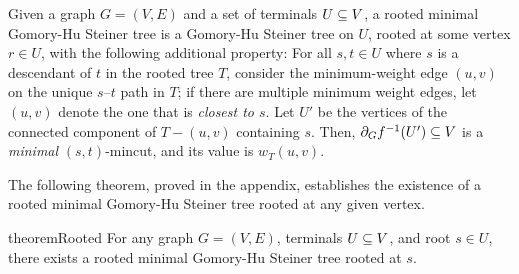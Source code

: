 \label{defn:minimalGH}
Given a graph $G=(V,E)$ and a set of terminals $U\subseteq V$, a rooted minimal Gomory-Hu Steiner tree is a Gomory-Hu Steiner tree on $U$, rooted at some vertex $r\in U$, with the following additional property:
 \BI
 \im[$(*)$] For all $s,t\in U$ where $s$ is a descendant of $t$ in the rooted tree $T$, consider the minimum-weight edge $(u,v)$ on the unique $s$--$t$ path in $T$; if there are multiple minimum weight edges, let $(u, v)$ denote the one that is {\em closest to $s$}. Let $U'$ be the vertices of the connected component of $T-(u,v)$ containing $s$.
Then, $\partial_Gf^{-1}(U')\subseteq V$ is a \emph{minimal} $(s,t)$-mincut, and its value is $w_T(u,v)$.
 \EI
\ED

The following theorem, proved in the appendix, establishes the existence of a rooted minimal Gomory-Hu Steiner tree rooted at any given vertex.

\begin{restatable}{theorem}{Rooted}
For any graph $G=(V,E)$, terminals $U\subseteq V$, and root $s\in U$, there exists a rooted minimal Gomory-Hu Steiner tree rooted at $s$.
\end{restatable}

